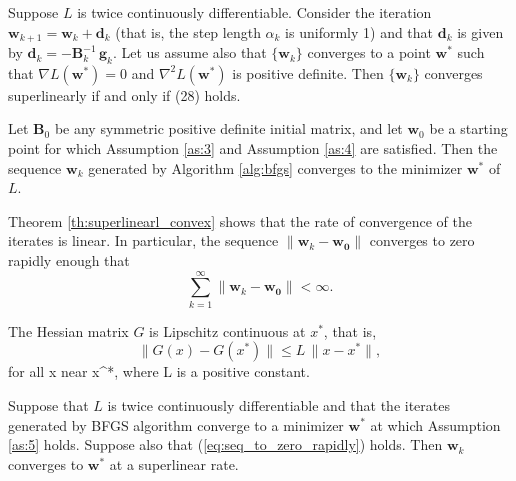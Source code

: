 \begin{theorem}
\label{th:superlinearl_qn}
Suppose $L$ is twice continuously differentiable. Consider the iteration $\mathbf{w}_{k+1}=\mathbf{w}_k + \mathbf{d}_k$ (that is, the step length $\alpha_k$ is uniformly 1) and that $\mathbf{d}_k$ is given by $\mathbf{d}_k = - \mathbf{B}_k^{-1} \, \mathbf{g}_k$. Let us assume also that $\{ \mathbf{w}_k\}$ converges to a point $\mathbf{w^*}$ such that $\nabla L (\mathbf{w}^*) = 0$ and $\nabla^2 L(\mathbf{w}^*)$ is positive definite. Then $\{ \mathbf{w}_k\}$ converges superlinearly if and only if (28) holds.
\end{theorem}

\begin{theorem}
\label{th:superlinearl_convex}
Let $\mathbf{B}_0$ be any symmetric positive definite initial matrix, and let $\mathbf{w}_0$ be a starting point for which Assumption \ref{as:3} and Assumption \ref{as:4} are satisfied. Then the sequence $\mathbf{w}_k$ generated by Algorithm \ref{alg:bfgs} converges to the minimizer $\mathbf{w^*}$ of $L$.
\end{theorem}

Theorem \ref{th:superlinearl_convex} shows that the rate of convergence of the iterates is linear. In particular, the sequence $\| \mathbf{w}_k - \mathbf{w_0}\|$ converges to zero rapidly enough that 
\begin{equation}\label{eq:seq_to_zero_rapidly}
    \sum_{k=1}^{\infty} \| \mathbf{w}_k - \mathbf{w_0}\| < \infty.
\end{equation}

\begin{assumption}
\label{as:5}
The Hessian matrix $G$ is Lipschitz continuous at $x^*$, that is,
\begin{equation}\label{eq:hessian_Lcontinuity}
    \| G(x) - G(x^*) \| \leq L\,\|x - x^*\|,
\end{equation}
for all x near x^*, where L is a positive constant.
\end{assumption}

\begin{theorem}
\label{th:superlinearl_nonconvex}
Suppose that $L$ is twice continuously differentiable and that the iterates generated by BFGS algorithm converge to a minimizer $\mathbf{w^*}$ at which Assumption \ref{as:5} holds. Suppose also that (\ref{eq:seq_to_zero_rapidly}) holds. Then $\mathbf{w}_k$ converges to $\mathbf{w^*}$ at a superlinear rate.
\end{theorem}

